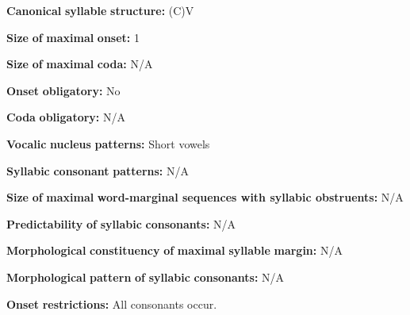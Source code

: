 \begin{styleBody}
\textbf{Canonical} \textbf{syllable} \textbf{structure:} (C)V \citep[11-12]{Franklin1971}
\end{styleBody}

\begin{styleBody}
\textbf{Size} \textbf{of} \textbf{maximal} \textbf{onset:} 1
\end{styleBody}

\begin{styleBody}
\textbf{Size} \textbf{of} \textbf{maximal} \textbf{coda:} N/A
\end{styleBody}

\begin{styleBody}
\textbf{Onset} \textbf{obligatory:} No
\end{styleBody}

\begin{styleBody}
\textbf{Coda} \textbf{obligatory:} N/A
\end{styleBody}

\begin{styleBody}
\textbf{Vocalic} \textbf{nucleus} \textbf{patterns:} Short vowels
\end{styleBody}

\begin{styleBody}
\textbf{Syllabic} \textbf{consonant} \textbf{patterns:} N/A
\end{styleBody}

\begin{styleBody}
\textbf{Size} \textbf{of} \textbf{maximal} \textbf{word{}-marginal sequences with syllabic obstruents:} N/A
\end{styleBody}

\begin{styleBody}
\textbf{Predictability} \textbf{of} \textbf{syllabic} \textbf{consonants:} N/A
\end{styleBody}

\begin{styleBody}
\textbf{Morphological} \textbf{constituency} \textbf{of} \textbf{maximal} \textbf{syllable} \textbf{margin:} N/A
\end{styleBody}

\begin{styleBody}
\textbf{Morphological} \textbf{pattern} \textbf{of} \textbf{syllabic} \textbf{consonants:} N/A
\end{styleBody}

\begin{styleBody}
\textbf{Onset} \textbf{restrictions:} All consonants occur.
\end{styleBody}

